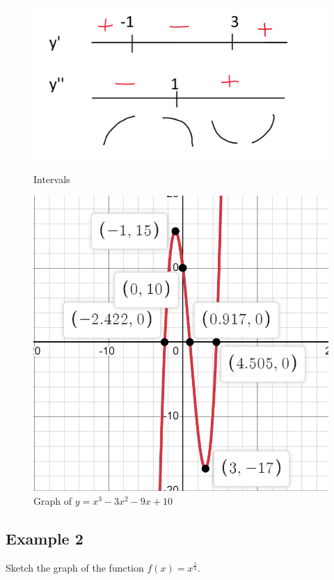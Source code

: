 \documentclass{article}
\begin{document}
\begin{figure}[h]
    \centering
    \begin{minipage}{0.5\textwidth}
        \centering
        \includegraphics[width=\textwidth]{imgs/alg 1.png}
        \caption{Intervals}
        \label{fig:alg1}
    \end{minipage}%
    \begin{minipage}{0.5\textwidth}
        \centering
        \includegraphics[width=\textwidth]{imgs/y=x^3-3x^2-9x+10.png}
        \caption{Graph of $y=x^3-3x^2-9x+10$}
        \label{fig:graph}
    \end{minipage}
\end{figure}
\newpage 
\subsection*{Example 2}
Sketch the graph of the function $f(x)=x^{\frac{1}{3}}$.
\end{document}
